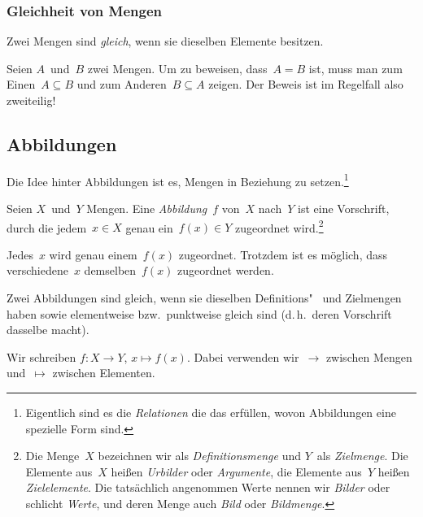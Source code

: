 \documentclass[a4paper]{article}
\begin{document}
\subsubsection{Gleichheit von Mengen}

\begin{remark}
    Zwei Mengen sind \emph{gleich}, wenn sie dieselben Elemente besitzen.
\end{remark}

Seien $A$~und~$B$ zwei Mengen. Um zu beweisen, dass~$A=B$ ist, muss man zum Einen~$A \subseteq B$ und zum Anderen~$B \subseteq A$ zeigen. Der Beweis ist im Regelfall also zweiteilig!

\subsection{Abbildungen}

Die Idee hinter Abbildungen ist es, Mengen in Beziehung zu setzen.\footnote{Eigentlich sind es die \emph{Relationen} die das erfüllen, wovon Abbildungen eine spezielle Form sind.}

\begin{definition}[Abbildung]
    Seien $X$~und~$Y$ Mengen. Eine \emph{Abbildung}~$f$ von~$X$ nach~$Y$ ist eine Vorschrift, durch die jedem~$x \in X$ genau ein~$f(x) \in Y$ zugeordnet wird.\footnote{Die Menge~$X$ bezeichnen wir als \emph{Definitionsmenge} und $Y$~als \emph{Zielmenge}. Die Elemente aus~$X$ heißen \emph{Urbilder} oder \emph{Argumente}, die Elemente aus~$Y$ heißen \emph{Zielelemente}. Die tatsächlich angenommen Werte nennen wir \emph{Bilder} oder schlicht \emph{Werte}, und deren Menge auch \emph{Bild} oder \emph{Bildmenge}.}
\end{definition}

\begin{remark}
    Jedes~$x$ wird genau einem~$f(x)$ zugeordnet. Trotzdem ist es möglich, dass verschiedene~$x$ demselben~$f(x)$ zugeordnet werden.
\end{remark}

\begin{remark}
    Zwei Abbildungen sind gleich, wenn sie dieselben Definitions"~ und Zielmengen haben sowie elementweise bzw.\ punktweise gleich sind (d.\,h.\ deren Vorschrift dasselbe macht).
\end{remark}

\begin{notation}
    Wir schreiben $f\colon X \to Y$, $x \mapsto f(x)$. Dabei verwenden wir~$\to$ zwischen Mengen und~$\mapsto$ zwischen Elementen.
\end{notation}
\end{document}
